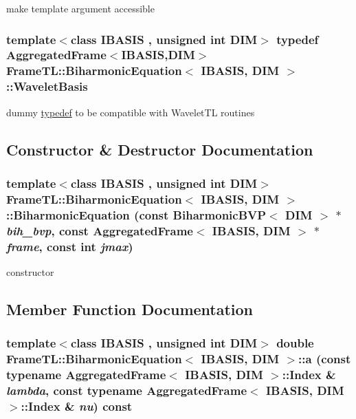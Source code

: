 make template argument accessible \hypertarget{classFrameTL_1_1BiharmonicEquation_2c96ea759f7da9b09717e9a68eb49a6f}{
\subsubsection[{WaveletBasis}]{\setlength{\rightskip}{0pt plus 5cm}template$<$class IBASIS , unsigned int DIM$>$ {\bf typedef} {\bf AggregatedFrame}$<$IBASIS,DIM$>$ {\bf FrameTL::BiharmonicEquation}$<$ IBASIS, DIM $>$::{\bf WaveletBasis}}}
\label{classFrameTL_1_1BiharmonicEquation_2c96ea759f7da9b09717e9a68eb49a6f}


dummy \hyperlink{structtypedef}{typedef} to be compatible with WaveletTL routines 

\subsection{Constructor \& Destructor Documentation}
\hypertarget{classFrameTL_1_1BiharmonicEquation_92657a3e07a5df0a73cb50563212a081}{
\subsubsection[{BiharmonicEquation}]{\setlength{\rightskip}{0pt plus 5cm}template$<$class IBASIS , unsigned int DIM$>$ {\bf FrameTL::BiharmonicEquation}$<$ IBASIS, DIM $>$::{\bf BiharmonicEquation} (const BiharmonicBVP$<$ DIM $>$ $\ast$ {\em bih\_\-bvp}, \/  const {\bf AggregatedFrame}$<$ IBASIS, DIM $>$ $\ast$ {\em frame}, \/  const int {\em jmax})}}
\label{classFrameTL_1_1BiharmonicEquation_92657a3e07a5df0a73cb50563212a081}


constructor 

\subsection{Member Function Documentation}
\hypertarget{classFrameTL_1_1BiharmonicEquation_7e489f4287862dad10b3334316bf786a}{
\subsubsection[{a}]{\setlength{\rightskip}{0pt plus 5cm}template$<$class IBASIS , unsigned int DIM$>$ double {\bf FrameTL::BiharmonicEquation}$<$ IBASIS, DIM $>$::a (const typename {\bf AggregatedFrame}$<$ IBASIS, DIM $>$::{\bf Index} \& {\em lambda}, \/  const typename {\bf AggregatedFrame}$<$ IBASIS, DIM $>$::{\bf Index} \& {\em nu}) const}}
\label{classFrameTL_1_1BiharmonicEquation_7e489f4287862dad10b3334316bf786a}


